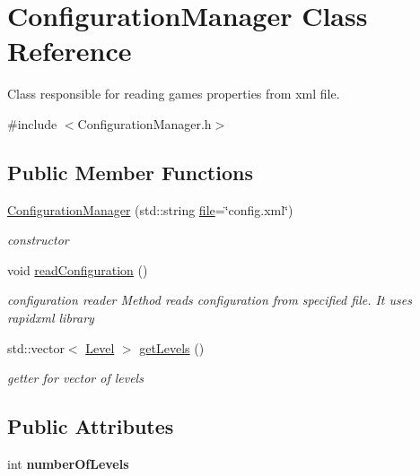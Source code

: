 \hypertarget{class_configuration_manager}{}\section{Configuration\+Manager Class Reference}
\label{class_configuration_manager}


Class responsible for reading game\textquotesingle{}s properties from xml file.  




{\ttfamily \#include $<$Configuration\+Manager.\+h$>$}

\subsection*{Public Member Functions}
\begin{DoxyCompactItemize}
\item 
\mbox{\hyperlink{class_configuration_manager_aee85c207758968e5ce0c291383aa51f6}{Configuration\+Manager}} (std\+::string \mbox{\hyperlink{classrapidxml_1_1file}{file}}=\char`\"{}config.\+xml\char`\"{})
\begin{DoxyCompactList}\small\item\em constructor \end{DoxyCompactList}\item 
\mbox{\label{class_configuration_manager_ae4a92204b4d685954df9249330adaca6}} 
void \mbox{\hyperlink{class_configuration_manager_ae4a92204b4d685954df9249330adaca6}{read\+Configuration}} ()
\begin{DoxyCompactList}\small\item\em configuration reader Method reads configuration from specified file. It uses rapidxml library \end{DoxyCompactList}\item 
\mbox{\label{class_configuration_manager_ab0484bee60058310602a8148bc668200}} 
std\+::vector$<$ \mbox{\hyperlink{class_level}{Level}} $>$ \mbox{\hyperlink{class_configuration_manager_ab0484bee60058310602a8148bc668200}{get\+Levels}} ()
\begin{DoxyCompactList}\small\item\em getter for vector of levels \end{DoxyCompactList}\end{DoxyCompactItemize}
\subsection*{Public Attributes}
\begin{DoxyCompactItemize}
\item 
\mbox{\label{class_configuration_manager_a055385b86b26a736af6ba2d24477a5b2}} 
int {\bfseries number\+Of\+Levels}
\end{DoxyCompactItemize}


